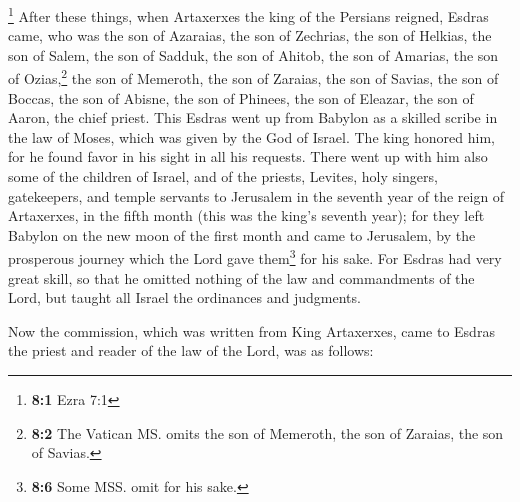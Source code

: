  \footnote{\textbf{8:1} Ezra 7:1} After these things, when
Artaxerxes the king of the Persians reigned, Esdras came, who was the
son of Azaraias, the son of Zechrias, the son of Helkias, the son of
Salem,  the son of Sadduk, the son of Ahitob, the son of
Amarias, the son of Ozias,\footnote{\textbf{8:2} The Vatican MS. omits
  the son of Memeroth, the son of Zaraias, the son of Savias.} the son
of Memeroth, the son of Zaraias, the son of Savias, the son of Boccas,
the son of Abisne, the son of Phinees, the son of Eleazar, the son of
Aaron, the chief priest.  This Esdras went up from Babylon
as a skilled scribe in the law of Moses, which was given by the God of
Israel.  The king honored him, for he found favor in his
sight in all his requests.  There went up with him also
some of the children of Israel, and of the priests, Levites, holy
singers, gatekeepers, and temple servants to Jerusalem  in
the seventh year of the reign of Artaxerxes, in the fifth month (this
was the king's seventh year); for they left Babylon on the new moon of
the first month and came to Jerusalem, by the prosperous journey which
the Lord gave them\footnote{\textbf{8:6} Some MSS. omit for his sake.}
for his sake.  For Esdras had very great skill, so that he
omitted nothing of the law and commandments of the Lord, but taught all
Israel the ordinances and judgments.

 Now the commission, which was written from King
Artaxerxes, came to Esdras the priest and reader of the law of the Lord,
was as follows:

